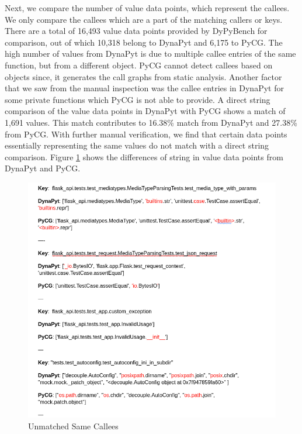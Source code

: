 Next, we compare the number of value data points, which represent the callees.
We only compare the callees which are a part of the matching callers or keys.
There are a total of 16,493 value data points provided by DyPyBench for comparison, out of which 10,318 belong to DynaPyt and 6,175 to PyCG.%
The high number of values from DynaPyt is due to multiple callee entries of the same function, but from a different object.
PyCG cannot detect callees based on objects since, it generates the call graphs from static analysis.
Another factor that we saw from the manual inspection was the callee entries in DynaPyt for some private functions which PyCG is not able to provide. 
A direct string comparison of the value data points in DynaPyt with PyCG shows a match of 1,691 values.
This match contributes to 16.38\% match from DynaPyt and 27.38\% from PyCG.
With further manual verification, we find that certain data points essentially representing the same values do not match with a direct string comparison.
Figure \ref{fig:unmatched_value_strings} shows the differences of string in value data points from DynaPyt and PyCG.
\begin{figure}[ht]
    \centering
    \includegraphics[width=0.8\linewidth]{figures/evaluation/string_compare.png}
    \caption[Unmatched Same Callees]{\label{fig:unmatched_value_strings}Unmatched Same Callees }
\end{figure}

